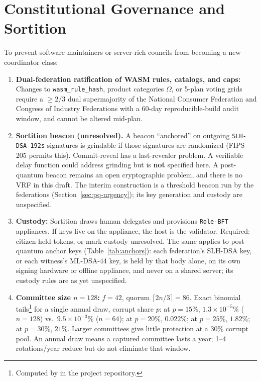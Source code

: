 \documentclass[10pt,twoside,openany]{book}
\theoremstyle{dpepstyle}
\begin{document}
\section{Constitutional Governance and Sortition}
\label{sec:sortition}

To prevent software maintainers or server-rich councils from becoming a new coordinator class:
\begin{enumerate}[leftmargin=1.8em,itemsep=2pt]
  \item \textbf{Dual-federation ratification of WASM rules, catalogs, and caps:} Changes to \texttt{wasm\_rule\_hash}, product categories $\Omega$, or 5-plan voting grids require a $\ge 2/3$ dual supermajority of the National Consumer Federation and Congress of Industry Federations with a 60-day reproducible-build audit window, and cannot be altered mid-plan.
  \item \textbf{Sortition beacon (unresolved).} A beacon ``anchored'' on outgoing \texttt{SLH-DSA-192s} signatures is grindable if those signatures are randomized (FIPS 205 permits this). Commit-reveal has a last-revealer problem. A verifiable delay function could address grinding but is \textbf{not} specified here. A post-quantum beacon remains an open cryptographic problem, and there is no VRF in this draft. The interim construction is a threshold beacon run by the federations (Section~\ref{sec:pq-urgency}); its key generation and custody are unspecified.
  \item \textbf{Custody:} Sortition draws human delegates and provisions \texttt{Role-BFT} appliances. If keys live on the appliance, the host is the validator. Required: citizen-held tokens, or mark custody unresolved. The same applies to post-quantum anchor keys (Table~\ref{tab:anchors}): each federation's SLH-DSA key, or each witness's ML-DSA-44 key, is held by that body alone, on its own signing hardware or offline appliance, and never on a shared server; its custody rules are as yet unspecified.
  \item \textbf{Committee size $n=128$:} $f=42$, quorum $\lceil 2n/3\rceil=86$. Exact binomial tails\footnote{Computed by  in the project repository.} for a single annual draw, corrupt share $p$: at $p=15\%$, $1.3\times 10^{-5}\%$ ($n=128$) vs.\ $9.5\times 10^{-3}\%$ ($n=64$); at $p=20\%$, $0.022\%$; at $p=25\%$, $1.82\%$; at $p=30\%$, $21\%$. Larger committees give little protection at a 30\% corrupt pool. An annual draw means a captured committee lasts a year; 1--4 rotations/year reduce but do not eliminate that window.
\end{enumerate}
\end{document}

